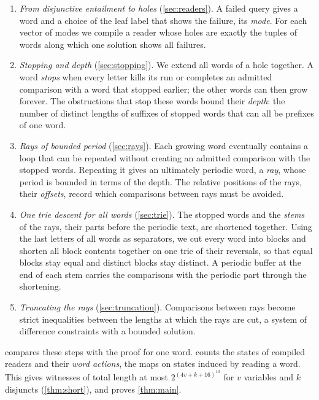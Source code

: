 \begin{enumerate}
\item \emph{From disjunctive entailment to holes} (\cref{sec:readers}). A failed query
  gives a word and a choice of the leaf label that shows the failure, its \emph{mode}.
  For each vector of modes we compile a reader whose holes are exactly the tuples of words
  along which one solution shows all failures.
\item \emph{Stopping and depth} (\cref{sec:stopping}). We extend all words of a hole
  together. A word \emph{stops} when every letter kills its run or completes an admitted
  comparison with a word that stopped earlier; the other words can then grow forever. The
  obstructions that stop these words bound their \emph{depth}: the number of distinct
  lengths of suffixes of stopped words that can all be prefixes of one word.
\item \emph{Rays of bounded period} (\cref{sec:rays}). Each growing word eventually
  contains a loop that can be repeated without creating an admitted comparison with the
  stopped words. Repeating it gives an ultimately periodic word, a \emph{ray}, whose period
  is bounded in terms of the depth. The relative positions of the rays, their
  \emph{offsets}, record which comparisons between rays must be avoided.
\item \emph{One trie descent for all words} (\cref{sec:trie}). The stopped words and the
  \emph{stems} of the rays, their parts before the periodic text, are shortened together.
  Using the last letters of all words as separators, we cut every word into blocks and
  shorten all block contents together on one trie of their reversals, so that equal blocks
  stay equal and distinct blocks stay distinct. A periodic buffer at the end of each stem
  carries the comparisons with the periodic part through the shortening.
\item \emph{Truncating the rays} (\cref{sec:truncation}). Comparisons between rays become
  strict inequalities between the lengths at which the rays are cut, a system of difference
  constraints with a bounded solution.
\end{enumerate}

 compares these steps with the proof for one word. 
counts the states of compiled readers and their \emph{word actions}, the maps on states
induced by reading a word. This gives witnesses of total
length at most $2^{(4v+k+16)^{10}}$ for $v$ variables and $k$ disjuncts (\cref{thm:short}),
and proves \cref{thm:main}.

